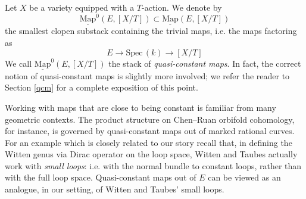\documentclass[11pt,letterpaper]{amsart}
\newcommand{\Map}[2]{\underline{\mathrm{Map}}\left (#1,#2\right )}
\newcommand{\Mapo}[2]{\underline{\mathrm{Map}}^{0}\left (#1,#2\right )}
\newcommand{\Spec}{\mathrm{S}\mathrm{pec}\,}
\begin{document}
Let  $X$ be a variety equipped with a $T$-action.    
We denote by 
\begin{equation}
\label{almostconstant}
\Mapo{E}{[X/T]} \subset \Map{E}{[X/T]}
\end{equation}
the smallest clopen substack containing the trivial maps, i.e. the maps factoring as 
$$
E \to \Spec(k) \to [X/T]
$$ 
We call $
\Mapo{E}{[X/T]}$ the stack of \emph{quasi-constant maps}. 
In fact, the correct notion of quasi-constant maps is slightly more involved; %
 we refer the reader to Section \ref{qcm} for a complete exposition of this point.



 Working with maps that are close to being constant is familiar from many geometric contexts.  The product structure on Chen--Ruan orbifold cohomology, for instance, is governed by quasi-constant maps out of  marked rational curves. %
 For an example which is closely related to our story recall that, %
in defining the Witten genus via Dirac operator on the loop space, Witten and Taubes actually work with \emph{small loops}: i.e. with the normal bundle to constant loops, rather than with the full loop space. Quasi-constant maps out of $E$ can be viewed as an analogue, in our setting, of Witten and Taubes' small loops.
\end{document}

